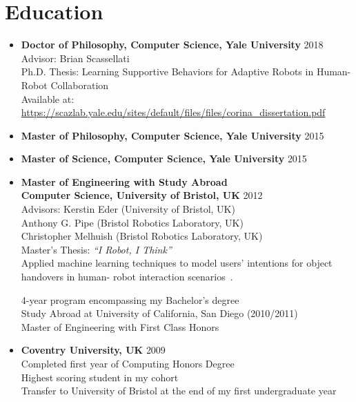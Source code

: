 \documentclass[10pt,letterpaper]{article}
\newcommand{\thing}[2]{{#1} \hfill {#2}}
\begin{document}
\section{Education}
\vspace{-0.5em}
\begin{itemize}%
\item \thing{\bf Doctor of Philosophy, Computer Science, Yale University}{2018}\\
	Advisor: Brian Scassellati\\
	Ph.D. Thesis: Learning Supportive Behaviors for Adaptive Robots in Human-Robot Collaboration \\
	Available at: \href{https://scazlab.yale.edu/sites/default/files/files/corina_dissertation.pdf}{\url{https://scazlab.yale.edu/sites/default/files/files/corina_dissertation.pdf}}
		
\item \thing{\bf Master of Philosophy, Computer Science, Yale University}{2015}
\item \thing{\bf Master of Science, Computer Science, Yale University}{2015}
\item \thing{\bf Master of Engineering with Study Abroad\\Computer Science, University of Bristol, UK}{2012}\\
	Advisors: Kerstin Eder (University of Bristol, UK)\\
	\hphantom{Advisors:} Anthony G. Pipe (Bristol Robotics Laboratory, UK)\\
	\hphantom{Advisors:} Christopher Melhuish (Bristol Robotics Laboratory, UK)\\
	Master's Thesis: {\it ``I Robot, I Think''}\\
	Applied machine learning techniques to model users' intentions for object handovers in human-
robot interaction scenarios~\cite{grigore2013joint}.

	4-year program encompassing my Bachelor's degree\\
	Study Abroad at University of California, San Diego (2010/2011)\\
	Master of Engineering with First Class Honors
\item \thing{\bf Coventry University, UK}{2009}\\
	Completed first year of Computing Honors Degree\\
	Highest scoring student in my cohort\\
	Transfer to University of Bristol at the end of my first undergraduate year
\end{itemize}
\end{document}
